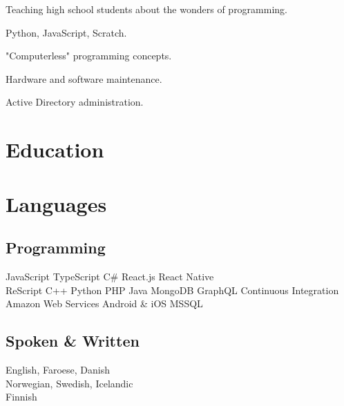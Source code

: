 \documentclass[]{deedy-resume-openfont}
\begin{document}
\begin{tightemize}
\item Teaching high school students about the wonders of programming.
\item Python, JavaScript, Scratch.
\item "Computerless" programming concepts.
\end{tightemize}
\sectionsep

\begin{tightemize}
\item Hardware and software maintenance.
\item Active Directory administration.
\end{tightemize}
\sectionsep

\section{Education}
\sectionsep

\section{Languages}
\begin{minipage}[t]{.6\textwidth}
\subsection{Programming}
JavaScript \textbullet{} TypeScript \textbullet{} C\# \textbullet{} React.js \textbullet{} React Native \\
ReScript \textbullet{} C++ \textbullet{} Python \textbullet{} PHP \textbullet{} Java \textbullet{} MongoDB \textbullet{} GraphQL \textbullet{} Continuous Integration \\
Amazon Web Services \textbullet{} Android \& iOS \textbullet{} MSSQL
\sectionsep
\end{minipage}
\hfill
\begin{minipage}[t]{.35\textwidth}
\subsection{Spoken \& Written}
 English, Faroese, Danish\\
 Norwegian, Swedish, Icelandic\\
 Finnish\\
\end{minipage}
\end{document}
